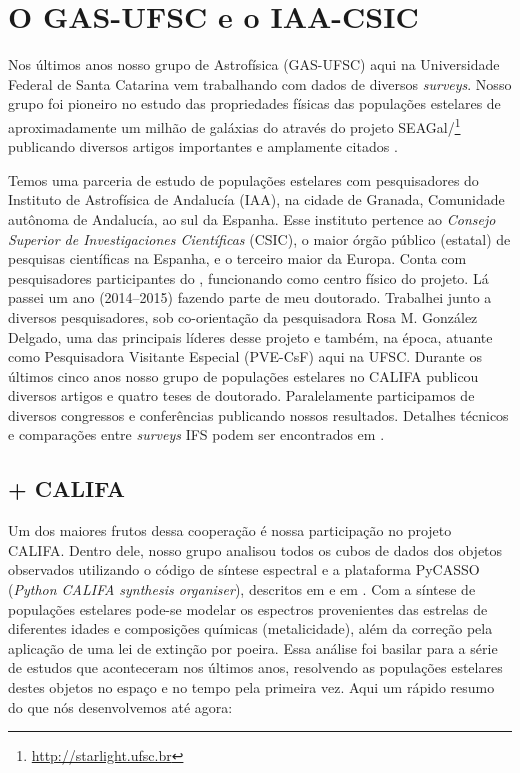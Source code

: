 \section{O GAS-UFSC e o IAA-CSIC}
\label{sec:intro:UFSCeIAA}

Nos últimos anos nosso grupo de Astrofísica (GAS-UFSC) aqui na Universidade Federal de Santa Catarina vem trabalhando com dados de diversos {\em surveys}. Nosso grupo foi pioneiro no estudo das propriedades físicas das populações estelares de aproximadamente um milhão de galáxias do \SDSS através do projeto SEAGal/\starlight\footnote{\href{http://starlight.ufsc.br}{http://starlight.ufsc.br}} publicando diversos artigos importantes e amplamente citados \citep[e.g., ][]{CidFernandes.etal.2005a, Mateus.etal.2006a, Stasinska.etal.2006a, Asari.etal.2007a, Stasinska.etal.2008a, CidFernandes.etal.2011a}.

Temos uma parceria de estudo de populações estelares com pesquisadores do Instituto de Astrofísica de Andalucía (IAA), na cidade de Granada, Comunidade autônoma de Andalucía, ao sul da Espanha. Esse instituto pertence ao {\em Consejo Superior de Investigaciones Científicas} (CSIC), o maior órgão público (estatal) de pesquisas científicas na Espanha, e o terceiro maior da Europa. Conta com pesquisadores participantes do \CALS, funcionando como centro físico do projeto. Lá passei um ano (2014--2015) fazendo parte de meu doutorado. Trabalhei junto a diversos pesquisadores, sob co-orientação da pesquisadora Rosa M. González Delgado, uma das principais líderes desse projeto e também, na época, atuante como Pesquisadora Visitante Especial (PVE-CsF) aqui na UFSC. Durante os últimos cinco anos nosso grupo de populações estelares no CALIFA publicou diversos artigos e quatro teses de doutorado. Paralelamente participamos de diversos congressos e conferências  publicando nossos resultados. Detalhes técnicos e comparações entre {\em surveys} IFS podem ser encontrados em \citet{Andre2015}.

\subsection{\STARLIGHT + CALIFA}
\label{sec:intro:UFSCeIAA:SLCAL}
Um dos maiores frutos dessa cooperação é nossa participação no projeto CALIFA. Dentro dele, nosso grupo analisou todos os cubos de dados dos objetos observados utilizando o código de síntese espectral \starlight e a plataforma PyCASSO ({\em Python CALIFA \starlight synthesis organiser}), descritos em \citet{CidFernandes.etal.2013a, CidFernandes.etal.2014a} e em \citet{deAmorim.etal.2017}. Com a síntese de populações estelares pode-se modelar os espectros provenientes das estrelas de diferentes idades e composições químicas (metalicidade), além da correção pela aplicação de uma lei de extinção por poeira. Essa análise foi basilar para a série de estudos que aconteceram nos últimos anos, resolvendo as populações estelares destes objetos no espaço e no tempo pela primeira vez. Aqui um rápido resumo do que nós desenvolvemos até agora:


